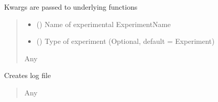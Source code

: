 \documentclass[letterpaper,10pt,english]{sphinxmanual}
\begin{document}
\begin{fulllineitems}
\begin{fulllineitems}
\sphinxAtStartPar
Kwargs are passed to underlying functions
\begin{quote}\begin{description}
\begin{itemize}
\item {} 
\sphinxAtStartPar
{} () \textendash{} Name of experimental ExperimentName

\item {} 
\sphinxAtStartPar
{} (\sphinxstyleliteralemphasis{\sphinxupquote{{[}}}\sphinxstyleliteralemphasis{\sphinxupquote{{]}}}) \textendash{} Type of experiment (Optional, default = Experiment)

\end{itemize}

\sphinxAtStartPar
Any

\end{description}\end{quote}

\end{fulllineitems}


\begin{fulllineitems}
\label{\detokenize{Organization:Organization.Mouse.create_log_file}}
\pysigstartsignatures
{}
\pysigstopsignatures
\sphinxAtStartPar
Creates log file
\begin{quote}\begin{description}
\sphinxAtStartPar
Any

\end{description}\end{quote}

\end{fulllineitems}



\end{fulllineitems}
\end{document}
